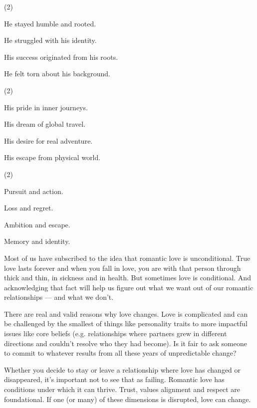 \documentclass{英语试卷}
\begin{document}
\begin{choices}(2)
  \item He stayed humble and rooted.
  \item He struggled with his identity.
  \item His success originated from his roots.
  \item He felt torn about his background.
\end{choices}
\begin{choices}(2)
  \item His pride in inner journeys.
  \item His dream of global travel.
  \item His desire for real adventure.
  \item His escape from physical world.
\end{choices}
\begin{choices}(2)
  \item Pursuit and action.
  \item Loss and regret.
  \item Ambition and escape.
  \item Memory and identity.
\end{choices}
\par Most of us have subscribed to the idea that romantic love is unconditional. True love lasts forever and when you fall in love, you are with that person through thick and thin, in sickness and in health. But sometimes love is conditional. And acknowledging that fact will help us figure out what we want out of our romantic relationships — and what we don't.\par
\par There are real and valid reasons why love changes. Love is complicated and can be challenged by the smallest of things like personality traits to more impactful issues like core beliefs (e.g. relationships where partners grew in different directions and couldn't resolve who they had become). Is it fair to ask someone to commit to whatever results from all these years of unpredictable change?\par
\par Whether you decide to stay or leave a relationship where love has changed or disappeared, it's important not to see that as failing. Romantic love has conditions under which it can thrive. Trust, values alignment and respect are foundational. If one (or many) of these dimensions is disrupted, love can change.\par
\end{document}
